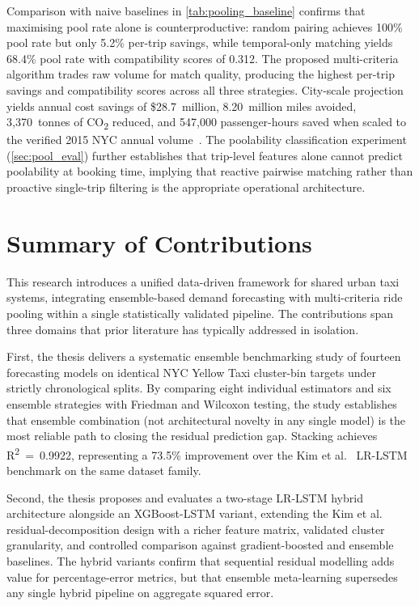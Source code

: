 Comparison with naive baselines in \autoref{tab:pooling_baseline} confirms that maximising pool rate alone is counterproductive: random pairing achieves 100\% pool rate but only 5.2\% per-trip savings, while temporal-only matching yields 68.4\% pool rate with compatibility scores of 0.312. The proposed multi-criteria algorithm trades raw volume for match quality, producing the highest per-trip savings and compatibility scores across all three strategies. City-scale projection yields annual cost savings of \$28.7~million, 8.20~million miles avoided, 3,370~tonnes of CO\textsubscript{2} reduced, and 547,000 passenger-hours saved when scaled to the verified 2015 NYC annual volume~\parencite{nyc_opendata_2015}. The poolability classification experiment (\autoref{sec:pool_eval}) further establishes that trip-level features alone cannot predict poolability at booking time, implying that reactive pairwise matching rather than proactive single-trip filtering is the appropriate operational architecture.

\section{Summary of Contributions}

This research introduces a unified data-driven framework for shared urban taxi systems, integrating ensemble-based demand forecasting with multi-criteria ride pooling within a single statistically validated pipeline. The contributions span three domains that prior literature has typically addressed in isolation.

First, the thesis delivers a systematic ensemble benchmarking study of fourteen forecasting models on identical NYC Yellow Taxi cluster-bin targets under strictly chronological splits. By comparing eight individual estimators and six ensemble strategies with Friedman and Wilcoxon testing, the study establishes that ensemble combination (not architectural novelty in any single model) is the most reliable path to closing the residual prediction gap. Stacking achieves R\textsuperscript{2}~=~0.9922, representing a 73.5\% improvement over the Kim et al.~\parencite{kim2020hybrid} LR-LSTM benchmark on the same dataset family.

Second, the thesis proposes and evaluates a two-stage LR-LSTM hybrid architecture alongside an XGBoost-LSTM variant, extending the Kim et al.~\parencite{kim2020hybrid} residual-decomposition design with a richer feature matrix, validated cluster granularity, and controlled comparison against gradient-boosted and ensemble baselines. The hybrid variants confirm that sequential residual modelling adds value for percentage-error metrics, but that ensemble meta-learning supersedes any single hybrid pipeline on aggregate squared error.

